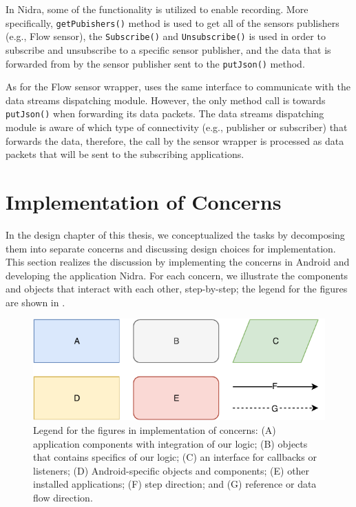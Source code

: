 In Nidra, some of the functionality is utilized to enable recording. More specifically, \verb|getPubishers()| method is used to get all of the sensors publishers (e.g., Flow sensor), the \verb|Subscribe()| and \verb|Unsubscribe()| is used in order to subscribe and unsubscribe to a specific sensor publisher, and the data that is forwarded from by the sensor publisher sent to the \verb|putJson()| method.

As for the Flow sensor wrapper, uses the same interface to communicate with the data streams dispatching module. However, the only method call is towards \verb|putJson()| when forwarding its data packets. The data streams dispatching module is aware of which type of connectivity (e.g., publisher or subscriber) that forwards the data, therefore, the call by the sensor wrapper is processed as data packets that will be sent to the subscribing applications. 

\section{Implementation of Concerns} \label{impl:ioc}
In the design chapter of this thesis, we conceptualized the tasks by decomposing them into separate concerns and discussing design choices for implementation. This section realizes the discussion by implementing the concerns in Android and developing the application Nidra. For each concern, we illustrate the components and objects that interact with each other, step-by-step; the legend for the figures are shown in . 

\begin{figure}[!h]
    \centering
    \includegraphics[scale=0.7]{images/Legend.pdf}
    \caption{Legend for the figures in implementation of concerns: (A) application components with integration of our logic; (B) objects that contains specifics of our logic; (C) an interface for callbacks or listeners; (D) Android-specific objects and components; (E) other installed applications; (F) step direction; and (G) reference or data flow direction.}
    \label{fig:legend}
\end{figure}

